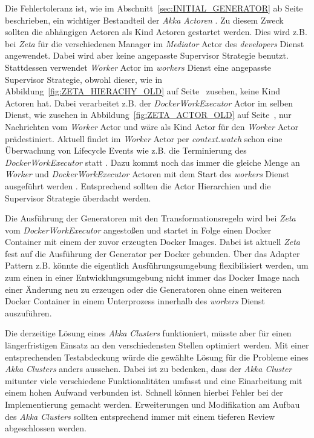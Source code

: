 Die Fehlertoleranz ist, wie im Abschnitt~\ref{sec:INITIAL_GENERATOR} ab Seite~\pageref{sec:INITIAL_GENERATOR} beschrieben, ein wichtiger Bestandteil der \textit{Akka Actoren} \cite{akka_fault_tolerance}. Zu diesem Zweck sollten die abhängigen Actoren als Kind Actoren gestartet werden. Dies wird z.B. bei \textit{Zeta} für die verschiedenen Manager im \textit{Mediator} Actor des \textit{developers} Dienst angewendet. Dabei wird aber keine angepasste Supervisor Strategie benutzt. Stattdessen verwendet \textit{Worker} Actor im \textit{workers} Dienst eine angepasste Supervisor Strategie, obwohl dieser, wie in Abbildung~\ref{fig:ZETA_HIERACHY_OLD} auf Seite~\pageref{fig:ZETA_HIERACHY_OLD} zusehen, keine Kind Actoren hat. Dabei verarbeitet z.B. der \textit{DockerWorkExecutor} Actor im selben Dienst, wie zusehen in Abbildung~\ref{fig:ZETA_ACTOR_OLD} auf Seite~\pageref{fig:ZETA_ACTOR_OLD}, nur Nachrichten vom \textit{Worker} Actor und wäre als Kind Actor für den \textit{Worker} Actor prädestiniert. Aktuell findet im \textit{Worker} Actor per \textit{context.watch} schon eine Überwachung von Lifecycle Events wie z.B. die Terminierung des \textit{DockerWorkExecutor} statt \cite{zeta_worker_actor}. Dazu kommt noch das immer die gleiche Menge an \textit{Worker} und \textit{DockerWorkExecutor} Actoren mit dem Start des \textit{workers} Dienst ausgeführt werden \cite{zeta_backend_main}. Entsprechend sollten die Actor Hierarchien und die Supervisor Strategie überdacht werden.

Die Ausführung der Generatoren mit den Transformationsregeln wird bei \textit{Zeta} vom \textit{DockerWorkExecutor} angestoßen und startet in Folge einen Docker Container mit einem der zuvor erzeugten Docker Images. Dabei ist aktuell \textit{Zeta} fest auf die Ausführung der Generator per Docker gebunden. Über das Adapter Pattern z.B. könnte die eigentlich Ausführungsumgebung flexibilisiert werden, um zum einen in einer Entwicklungsumgebung nicht immer das Docker Image nach einer Änderung neu zu erzeugen oder die Generatoren ohne einen weiteren Docker Container in einem Unterprozess innerhalb des \textit{workers} Dienst auszuführen.

Die derzeitige Lösung eines \textit{Akka Clusters} funktioniert, müsste aber für einen längerfristigen Einsatz an den verschiedensten Stellen optimiert werden. Mit einer entsprechenden Testabdeckung würde die gewählte Lösung für die Probleme eines \textit{Akka Clusters} anders aussehen. Dabei ist zu bedenken, dass der \textit{Akka Cluster} mitunter viele verschiedene Funktionalitäten umfasst und eine Einarbeitung mit einem hohen Aufwand verbunden ist. Schnell können hierbei Fehler bei der Implementierung gemacht werden. Erweiterungen und Modifikation am Aufbau des \textit{Akka Clusters} sollten entsprechend immer mit einem tieferen Review abgeschlossen werden. 

